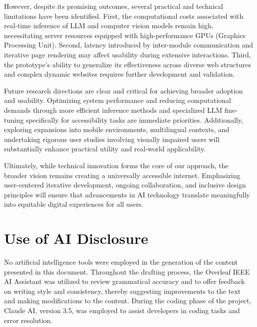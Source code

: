 \documentclass[conference]{IEEEtran}
\begin{document}
However, despite its promising outcomes, several practical and technical limitations have been identified. First, the computational costs associated with real-time inference of LLM and computer vision models remain high, necessitating server resources equipped with high-performance GPUs (Graphics Processing Unit). Second, latency introduced by inter-module communication and iterative page rendering may affect usability during extensive interactions. Third, the prototype's ability to generalize its effectiveness across diverse web structures and complex dynamic websites requires further development and validation.

Future research directions are clear and critical for achieving broader adoption and usability. Optimizing system performance and reducing computational demands through more efficient inference methods and specialized LLM fine-tuning specifically for accessibility tasks are immediate priorities. Additionally, exploring expansions into mobile environments, multilingual contexts, and undertaking rigorous user studies involving visually impaired users will substantially enhance practical utility and real-world applicability.

Ultimately, while technical innovation forms the core of our approach, the broader vision remains creating a universally accessible internet. Emphasizing user-centered iterative development, ongoing collaboration, and inclusive design principles will ensure that advancements in AI technology translate meaningfully into equitable digital experiences for all users.


\section{Use of AI Disclosure}\label{ai-disclosure}
No artificial intelligence tools were employed in the generation of the content presented in this document. Throughout the drafting process, the Overleaf IEEE AI Assistant was utilized to review grammatical accuracy and to offer feedback on writing style and consistency, thereby suggesting improvements to the text and making modifications to the content. During the coding phase of the project, Claude AI, version 3.5, was employed to assist developers in coding tasks and error resolution.




\end{document}
